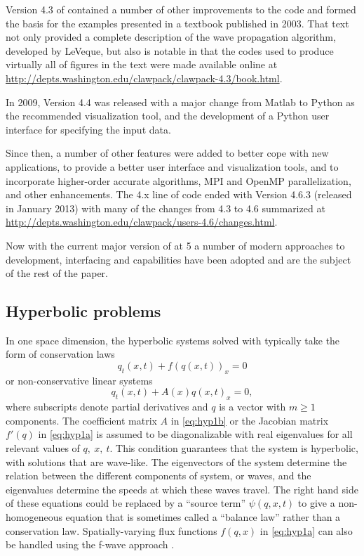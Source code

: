 Version 4.3 of \clawpack contained a number of other improvements to
the code and formed the basis for the examples presented in a textbook
\cite{rjl:fvmhp} published in 2003.  That text not only provided a
complete description of the wave propagation algorithm, developed by LeVeque,
but also is notable in that the codes used to produce virtually all of figures
in the text were made available online \cite{rjl:fvmhp}
at \url{http://depts.washington.edu/clawpack/clawpack-4.3/book.html}.

In 2009, \clawpack Version 4.4 was released with a major change from Matlab
to Python as the recommended visualization tool, and the development
of a Python user interface for specifying the input data.

Since then, a number of other features were added to better cope with new
applications, to provide a better user interface and visualization tools, and to
incorporate higher-order accurate algorithms, MPI and OpenMP parallelization, and
other enhancements. The \clawpack 4.x line of code ended with Version 4.6.3
(released in January 2013) with many of the changes from 4.3 to 4.6 summarized at
\url{http://depts.washington.edu/clawpack/users-4.6/changes.html}.

Now with the current major version of \clawpack at 5 a number of modern
approaches to development, interfacing and capabilities have been adopted and
are the subject of the rest of the paper.

\subsection{Hyperbolic problems}\label{sec:hyp}

In one space dimension, the hyperbolic systems solved with
\clawpack typically take the form of conservation laws
\begin{equation}\label{eq:hyp1a}
q_t(x,t) + f(q(x,t))_x = 0
\end{equation}
or non-conservative linear systems
\begin{equation}\label{eq:hyp1b}
q_t(x,t) + A(x) q(x,t)_x = 0,
\end{equation}
where subscripts denote partial derivatives and $q$ is a vector with
$m\ge 1$ components.  The coefficient matrix $A$ in \cref{eq:hyp1b} or
the Jacobian matrix $f'(q)$ in \cref{eq:hyp1a} is assumed to be
diagonalizable with real eigenvalues for all relevant values of
$q,~x,~t$.  This condition guarantees that the system is hyperbolic,
with solutions that are wave-like.  The eigenvectors of the system
determine the relation between the different components
of system, or waves, and the eigenvalues determine the speeds at which these
waves travel.  The right hand side of these equations could be
replaced by a ``source term'' $\psi(q,x,t)$ to give a non-homogeneous
equation that is sometimes called a ``balance law'' rather than a
conservation law.  Spatially-varying flux functions $f(q,x)$ in
\cref{eq:hyp1a} can also be handled using the f-wave approach
\cite{db-rjl-sm-jr:vcflux}.

